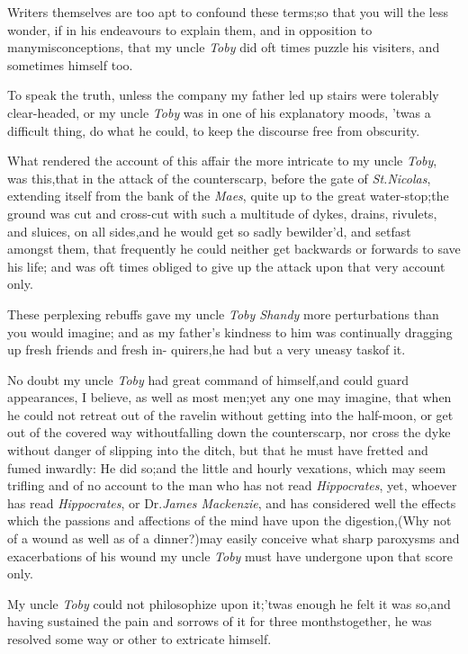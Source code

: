 \documentclass{article}
\begin{document}
Writers themselves are too apt to confound these terms;\tsh so that
you will the less wonder, if in his endeavours to explain them, and
in opposition to many\pb misconceptions, that my uncle \textit{Toby} did
oft times puzzle his visiters, and sometimes himself too.

To speak the truth, unless the compa\-ny my father led up stairs
were tolerably clear-headed, or my uncle \textit{Toby} was in one of
his explanatory moods, ’twas a difficult thing, do what he could, to keep the
discourse free from obscurity.

What rendered the account of this\break 
affair the more intricate to my uncle\break
\textit{Toby}, was this,\tsk that in the attack of the
counterscarp, before the gate of \textit{St.\@ Nicolas}, extending
itself from the bank of the \textit{Maes}, quite up to the great
water-stop;\tsk the ground was cut and cross-cut with such a
multitude of dykes, drains, rivulets, and sluices, on all
sides,\tsk and he would get so sadly bewilder’d, and set\pb fast
amongst them, that frequently he could neither get backwards or
forwards to save his life; and was oft times obliged to give up the
attack upon that very account only.

These perplexing rebuffs gave my\break
uncle \textit{Toby Shandy} more perturbations\break
than you would imagine; and as my\break
father’s kindness to him was continually\break
dragging up fresh friends and fresh in-\break 
quirers,\tsk he had but a very uneasy task\break of it.

No doubt my uncle \textit{Toby} had great command of
himself,\tsk and could guard appearances, I believe, as well as
most men;\tsk yet any one may imagine, that when he could not
retreat out of the ravelin without getting into the half-moon,
or get out of the covered way without\pb falling down the
counterscarp, nor cross the dyke without danger of slipping into
the ditch, but that he must have fretted and fumed inwardly:\tsk
He did so;\tsk and the little and hourly vexations, which may
seem trifling and of no account to the man who has not read
\textit{Hippocrates}, yet, whoever has read
\textit{Hippocrates}, or Dr.\@ \textit{James Mackenzie},
and has considered well the effects which the passions and
affections of the mind have upon the digestion,\tsk (Why not of a
wound as well as of a dinner?)\tsk may easily conceive what
sharp paroxysms and exacerbations of his wound my uncle
\textit{Toby} must have undergone upon that score only.

\tsk My uncle \textit{Toby} could not philoso\-phize upon
it;\tsk ’twas enough he felt it was so,\tsk and having
sustained the pain and sorrows of it for three months\pb together, he was resolved some
way or other to extricate himself.
\end{document}
